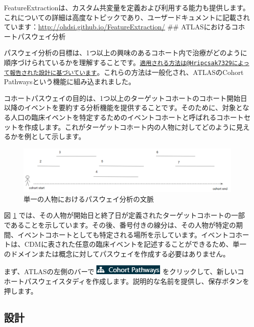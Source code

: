 \documentclass[
  11pt]{book}
\theoremstyle{definition}
\theoremstyle{definition}
\theoremstyle{definition}
\theoremstyle{definition}
\theoremstyle{remark}
\begin{document}
FeatureExtractionは、カスタム共変量を定義および利用する能力も提供します。これについての詳細は高度なトピックであり、ユーザードキュメントに記載されています：\url{http://ohdsi.github.io/FeatureExtraction/}
\#\# ATLASにおけるコホートパスウェイ分析

パスウェイ分析の目標は、1つ以上の興味のあるコホート内で治療がどのように順序づけられているかを理解することです。\href{mailto:適用される方法は@Hripcsak7329によって報告された設計に基づいています}{\nolinkurl{適用される方法は@Hripcsak7329によって報告された設計に基づいています}}。これらの方法は一般化され、ATLASのCohort Pathwaysという機能に組み込まれました。

コホートパスウェイの目的は、1つ以上のターゲットコホートのコホート開始日以降のイベントを要約する分析機能を提供することです。そのために、対象となる人口の臨床イベントを特定するためのイベントコホートと呼ばれるコホートセットを作成します。これがターゲットコホート内の人物に対してどのように見えるかを例として示します。

\begin{figure}

{\centering \includegraphics[width=1\linewidth]{images/Characterization/pathwaysPersonEventView} 

}

\caption{単一の人物におけるパスウェイ分析の文脈}\label{fig:pathwaysPersonEventView}
\end{figure}

図 \ref{fig:pathwaysPersonEventView} では、その人物が開始日と終了日が定義されたターゲットコホートの一部であることを示しています。その後、番号付きの線分は、その人物が特定の期間、イベントコホートとしても特定される場所を示しています。イベントコホートは、CDMに表された任意の臨床イベントを記述することができるため、単一のドメインまたは概念に対してパスウェイを作成する必要はありません。

まず、ATLASの左側のバーで \includegraphics{images/Characterization/atlasPathwaysMenuItem.png} をクリックして、新しいコホートパスウェイスタディを作成します。説明的な名前を提供し、保存ボタンを押します。

\subsection{設計}\label{ux8a2dux8a08}
\end{document}
